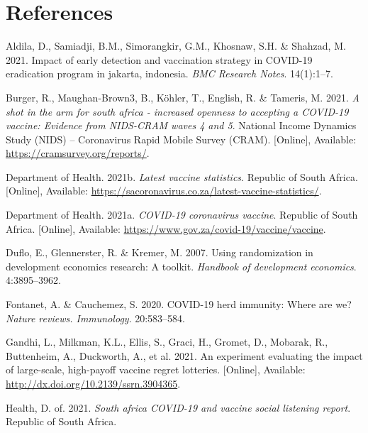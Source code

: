 \documentclass[11pt,preprint, authoryear]{elsarticle}
\numberwithin{equation}{section}
\numberwithin{figure}{section}
\numberwithin{table}{section}
\newlength{\cslhangindent}
\newenvironment{CSLReferences}%
  {\setlength{\parindent}{0pt}%
  \everypar{\setlength{\hangindent}{\cslhangindent}}\ignorespaces}%
  {\par}
\begin{document}
\newpage

\hypertarget{references}{%
\section*{References}\label{references}}

\hypertarget{refs}{}
\begin{CSLReferences}{1}{0}
\leavevmode\hypertarget{ref-erad}{}%
Aldila, D., Samiadji, B.M., Simorangkir, G.M., Khosnaw, S.H. \& Shahzad,
M. 2021. Impact of early detection and vaccination strategy in COVID-19
eradication program in jakarta, indonesia. \emph{BMC Research Notes}.
14(1):1--7.

\leavevmode\hypertarget{ref-cram}{}%
Burger, R., Maughan-Brown3, B., Köhler, T., English, R. \& Tameris, M.
2021. \emph{A shot in the arm for south africa - increased openness to
accepting a COVID-19 vaccine: Evidence from NIDS-CRAM waves 4 and 5}.
National Income Dynamics Study (NIDS) -- Coronavirus Rapid Mobile Survey
(CRAM). {[}Online{]}, Available: \url{https://cramsurvey.org/reports/}.

\leavevmode\hypertarget{ref-stat}{}%
Department of Health. 2021b. \emph{Latest vaccine statistics}. Republic
of South Africa. {[}Online{]}, Available:
\url{https://sacoronavirus.co.za/latest-vaccine-statistics/}.

\leavevmode\hypertarget{ref-herd}{}%
Department of Health. 2021a. \emph{COVID-19 coronavirus vaccine}.
Republic of South Africa. {[}Online{]}, Available:
\url{https://www.gov.za/covid-19/vaccine/vaccine}.

\leavevmode\hypertarget{ref-random}{}%
Duflo, E., Glennerster, R. \& Kremer, M. 2007. Using randomization in
development economics research: A toolkit. \emph{Handbook of development
economics}. 4:3895--3962.

\leavevmode\hypertarget{ref-immun}{}%
Fontanet, A. \& Cauchemez, S. 2020. COVID-19 herd immunity: Where are
we? \emph{Nature reviews. Immunology}. 20:583--584.

\leavevmode\hypertarget{ref-regret}{}%
Gandhi, L., Milkman, K.L., Ellis, S., Graci, H., Gromet, D., Mobarak,
R., Buttenheim, A., Duckworth, A., et al. 2021. An experiment evaluating
the impact of large-scale, high-payoff vaccine regret lotteries.
{[}Online{]}, Available: \url{http://dx.doi.org/10.2139/ssrn.3904365}.

\leavevmode\hypertarget{ref-dep}{}%
Health, D. of. 2021. \emph{South africa COVID-19 and vaccine social
listening report}. Republic of South Africa.


\end{CSLReferences}
\end{document}
